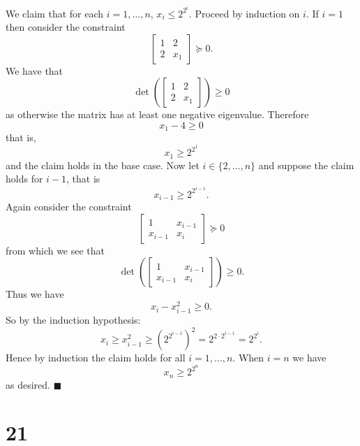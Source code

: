 \documentclass[letterpaper,12pt,oneside,onecolumn]{article}
\newcommand{\1}{\mathbbm{1}}
\begin{document}
\paragraph{}
We claim that for each $i = 1,\dots, n$, $x_i \leq 2^{2^{i}}$. Proceed by induction on $i$. If $i = 1$ then consider the constraint
$$\begin{bmatrix} 1 & 2 \\2 & x_1\end{bmatrix} \succcurlyeq 0.$$
We have that
$$\det(\begin{bmatrix} 1 & 2 \\2 & x_1\end{bmatrix}) \geq 0$$
as otherwise the matrix has at least one negative eigenvalue. Therefore
$$ x_1 - 4 \geq 0$$
that is,
$$ x_1 \geq 2^{2^1}$$
and the claim holds in the base case. Now let $i \in \{2,\dots, n\}$ and suppose the claim holds for $i-1$, that is
$$x_{i-1} \geq 2^{2^{i-1}}.$$
Again consider the constraint
$$ \begin{bmatrix} 1 & x_{i-1}\\ x_{i-1} & x_i \end{bmatrix} \succcurlyeq 0$$
from which we see that
$$\det( \begin{bmatrix} 1 & x_{i-1}\\ x_{i-1} & x_i \end{bmatrix}) \geq 0.$$
Thus we have 
$$x_i - x_{i-1}^2 \geq 0.$$
So by the induction hypothesis:
$$x_i \geq x_{i-1}^2 \geq (2^{2^{i-1}})^2 = 2^{2\cdot 2^{i-1}} = 2^{2^i}.$$
Hence by induction the claim holds for all $i = 1, \dots, n$. When $i = n$ we have
$$x_n \geq 2^{2^n}$$
as desired. $\blacksquare$

\section*{21}
\end{document}
